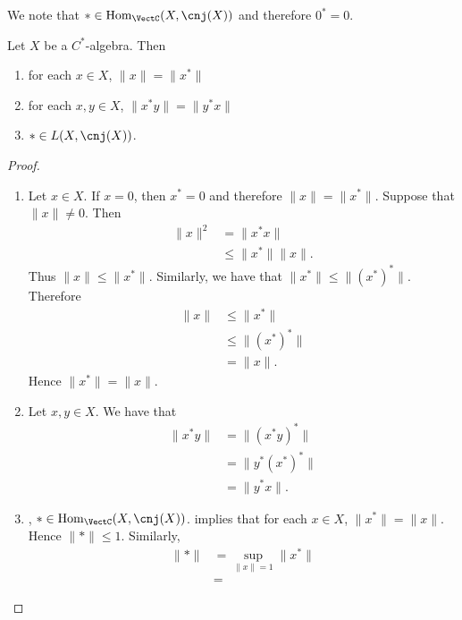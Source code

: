 \documentclass{book}
\begin{document}
	\begin{note}
		We note that $* \in \Hom_{\VectC}(X, \cnj(X))$ and therefore $0^* = 0$. 
	\end{note}

	\begin{ex}
		Let $X$ be a $C^*$-algebra. Then  
		\begin{enumerate}
			\item for each $x \in X$, $\|x\| = \|x^*\|$
			\item for each $x,y \in X$, $\|x^*y\| = \|y^*x\|$
			\item $* \in L(X, \cnj(X))$.
		\end{enumerate}
	\end{ex}

	\begin{proof}
		\begin{enumerate}
			\item  Let $x \in X$. If $x = 0$, then $x^* = 0$ and therefore $\|x\| = \|x^*\|$. Suppose that $\|x\| \neq 0$. Then 
			\begin{align*}
				\|x\|^2
				& = \|x^* x\| \\
				& \leq \|x^*\| \|x\|. 
			\end{align*}
			Thus $\|x\| \leq \|x^*\|$. Similarly, we have that $\|x^*\| \leq \|(x^*)^*\|$. Therefore
			\begin{align*}
				\|x\| 
				& \leq \|x^*\| \\ 
				& \leq \|(x^*)^*\| \\
				& = \|x\|.
			\end{align*}
			Hence $\|x^*\| = \|x\|$.
			\item Let $x, y \in X$. We have that
			\begin{align*}
				\|x^* y\|
				& = \|(x^*y)^*\| \\
				& = \|y^*(x^*)^*\| \\
				& = \|y^* x\|.
			\end{align*}
			\item {}, $* \in \Hom_{\VectC}(X, \cnj(X))$.  implies that for each $x \in X$, $\|x^*\| = \|x\|$. Hence $\|*\| \leq 1$. Similarly, 
			\begin{align*}
				\|*\| 
				& = \sup\limits_{\|x\| = 1} \|x^*\| \\ 
				& = 
			\end{align*}
		\end{enumerate}
	\end{proof}
\end{document}

